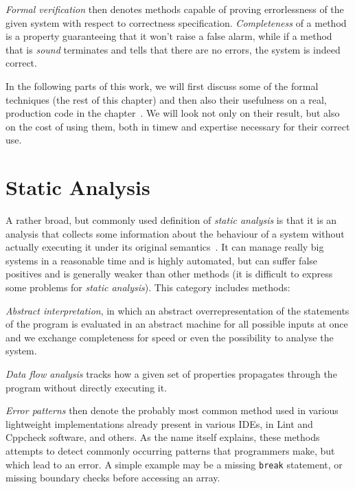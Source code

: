{\em Formal verification} then denotes methods capable of proving errorlessness of the given system with respect to correctness specification. {\em Completeness} of a method is a property guaranteeing that it won't raise a false alarm, while if a method that is {\em sound} terminates and tells that there are no errors, the system is indeed correct.

In the following parts of this work, we will first discuss some of the formal techniques (the rest of this chapter) and then also their usefulness on a real, production code in the chapter~. We will look not only on their result, but also on the cost of using them, both in timew and expertise necessary for their correct use.

\section{Static Analysis}\label{chap:fav:staticAnalysis}
A rather broad, but commonly used definition of {\em static analysis} is that it is an analysis that collects some information about the behaviour of a system without actually executing it under its original semantics~\cite[Chap. 2.2]{KrenaVojnarOverview}. It can manage really big systems in a reasonable time and is highly automated, but can suffer false positives and is generally weaker than other methods (it is difficult to express some problems for {\em static analysis}). This category includes methods:

{\em Abstract interpretation}, in which an abstract overrepresentation of the statements of the program is evaluated in an abstract machine for all possible inputs at once and we exchange completeness for speed or even the possibility to analyse the system.

{\em Data flow analysis} tracks how a given set of properties propagates through the program without directly executing it.

{\em Error patterns} then denote the probably most common method used in various lightweight implementations already present in various IDEs, in Lint and Cppcheck software, and others. As the name itself explains, these methods attempts to detect commonly occurring patterns that programmers make, but which lead to an error. A simple example may be a missing {\tt break} statement, or missing boundary checks before accessing an array.

